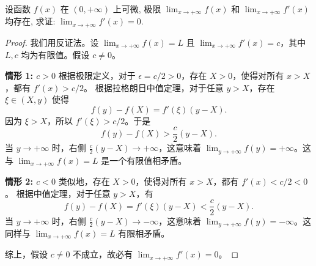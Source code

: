 \documentclass[lang=cn,10pt,thmcnt=section]{elegantbook}
\begin{document}
\begin{example}
    设函数 \( f(x) \) 在 \((0, +\infty)\) 上可微, 极限 \(\lim_{x \to +\infty} f(x)\) 和 \(\lim_{x \to +\infty} f'(x)\) 均存在, 求证: \(\lim_{x \to +\infty} f'(x) = 0\).
\end{example}
\begin{proof}
    我们用反证法。设 $\lim_{x\to+\infty} f(x) = L$ 且 $\lim_{x\to+\infty} f'(x) = c$，其中 $L, c$ 均为有限值。假设 $c \neq 0$。
    
    \textbf{情形 1: \(c > 0\)}
    根据极限定义，对于 $\epsilon = c/2 > 0$，存在 $X > 0$，使得对所有 $x > X$，都有 $f'(x) > c/2$。
    根据拉格朗日中值定理，对于任意 $y > X$，存在 $\xi \in (X, y)$ 使得
    \[ f(y) - f(X) = f'(\xi)(y-X). \]
    因为 $\xi > X$，所以 $f'(\xi) > c/2$。于是
    \[ f(y) - f(X) > \frac{c}{2}(y-X). \]
    当 $y \to +\infty$ 时，右侧 $\frac{c}{2}(y-X) \to +\infty$，这意味着 $\lim_{y\to+\infty} f(y) = +\infty$。这与 $\lim_{x\to+\infty} f(x) = L$ 是一个有限值相矛盾。
    
    \textbf{情形 2: \(c < 0\)}
    类似地，存在 $X > 0$，使得对所有 $x > X$，都有 $f'(x) < c/2 < 0$。
    根据中值定理，对于任意 $y > X$，有
    \[ f(y) - f(X) = f'(\xi)(y-X) < \frac{c}{2}(y-X). \]
    当 $y \to +\infty$ 时，右侧 $\frac{c}{2}(y-X) \to -\infty$，这意味着 $\lim_{y\to+\infty} f(y) = -\infty$。这同样与 $\lim_{x\to+\infty} f(x) = L$ 有限相矛盾。
    
    综上，假设 $c \neq 0$ 不成立，故必有 $\lim_{x\to+\infty} f'(x) = 0$。
\end{proof}
\end{document}
